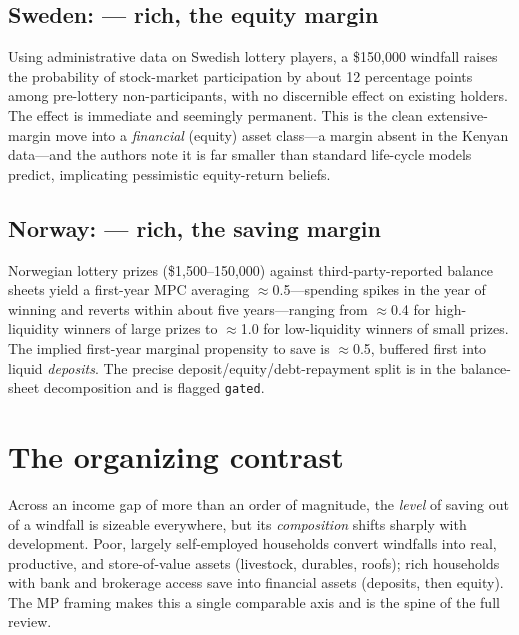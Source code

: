 \documentclass[11pt,a4paper]{article}
\newcommand{\mpx}{\mathrm{MP}}
\begin{document}
\subsection{Sweden: \citet{briggs2021windfall} --- rich, the equity margin}
Using administrative data on Swedish lottery players, a \$150{,}000 windfall
raises the probability of stock-market participation by about 12 percentage
points among pre-lottery non-participants, with no discernible effect on existing
holders. The effect is immediate and seemingly permanent. This is the clean
extensive-margin move into a \emph{financial} (equity) asset class---a margin
absent in the Kenyan data---and the authors note it is far smaller than standard
life-cycle models predict, implicating pessimistic equity-return beliefs.

\subsection{Norway: \citet{fagereng2021mpc} --- rich, the saving margin}
Norwegian lottery prizes (\$1{,}500--150{,}000) against third-party-reported
balance sheets yield a first-year MPC averaging $\approx$0.5---spending spikes in
the year of winning and reverts within about five years---ranging from $\approx$0.4
for high-liquidity winners of large prizes to $\approx$1.0 for low-liquidity
winners of small prizes. The implied first-year marginal propensity to save is
$\approx$0.5, buffered first into liquid \emph{deposits}. The precise
deposit/equity/debt-repayment split is in the balance-sheet decomposition and is
flagged \texttt{gated}.

\section{The organizing contrast}
Across an income gap of more than an order of magnitude, the \emph{level} of
saving out of a windfall is sizeable everywhere, but its \emph{composition}
shifts sharply with development. Poor, largely self-employed households convert
windfalls into real, productive, and store-of-value assets (livestock, durables,
roofs); rich households with bank and brokerage access save into financial assets
(deposits, then equity). The $\mpx$ framing makes this a single comparable axis
and is the spine of the full review.
\end{document}
